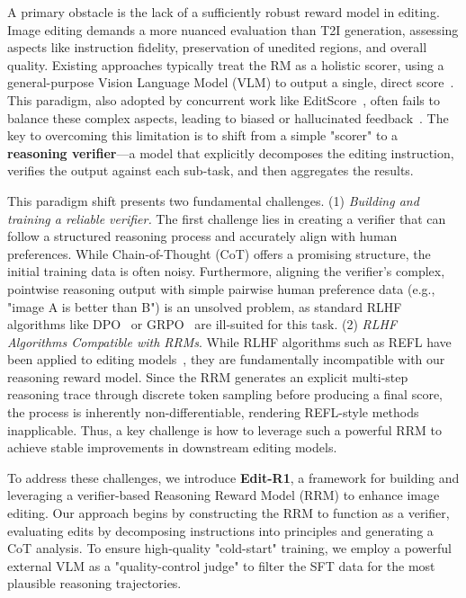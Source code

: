 A primary obstacle is the lack of a sufficiently robust reward model in editing. Image editing demands a more nuanced evaluation than T2I generation, assessing aspects like instruction fidelity, preservation of unedited regions, and overall quality. 
Existing approaches typically treat the RM as a holistic scorer, using a general-purpose Vision Language Model (VLM) to output a single, direct score~\citep{gong2025onereward,wei2025skywork}. 
This paradigm, also adopted by concurrent work like EditScore~\citep{luo2025editscore}, often fails to balance these complex aspects, leading to biased or hallucinated feedback~\citep{gunjal2025rubrics}. 
The key to overcoming this limitation is to shift from a simple "scorer" to a \textbf{reasoning verifier}—a model that explicitly decomposes the editing instruction, verifies the output against each sub-task, and then aggregates the results.

This paradigm shift presents two fundamental challenges.
 (1) \textit{Building and training a reliable verifier.} The first challenge lies in creating a verifier that can follow a structured reasoning process and accurately align with human preferences. While Chain-of-Thought (CoT) offers a promising structure, the initial training data is often noisy. Furthermore, aligning the verifier's complex, pointwise reasoning output with simple pairwise human preference data (e.g., "image A is better than B") is an unsolved problem, as standard RLHF algorithms like DPO~\cite{rafailov2023direct} or GRPO~\cite{guo2025deepseek} are ill-suited for this task.
 (2) \textit{RLHF Algorithms Compatible with RRMs}. While RLHF algorithms such as REFL have been applied to editing models~\citep{gong2025onereward,ren2024byteedit}, they are fundamentally incompatible with our reasoning reward model. Since the RRM generates an explicit multi-step reasoning trace through discrete token sampling before producing a final score, the process is inherently non-differentiable, rendering REFL-style methods inapplicable. Thus, a key challenge is how to leverage such a powerful RRM to achieve stable improvements in downstream editing models.


To address these challenges, we introduce \textbf{Edit-R1}, a framework for building and leveraging a verifier-based Reasoning Reward Model (RRM) to enhance image editing. Our approach begins by constructing the RRM to function as a verifier, evaluating edits by decomposing instructions into principles and generating a CoT analysis. To ensure high-quality "cold-start" training, we employ a powerful external VLM as a "quality-control judge" to filter the SFT data for the most plausible reasoning trajectories.

